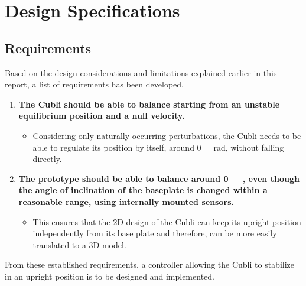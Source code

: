 \chapter{Design Specifications}\label{chap:specifications}


\section{Requirements}\label{sec:requirements}
Based on the design considerations and limitations explained earlier in this report, a list of requirements has been developed. %
%
\begin{enumerate}
\item \textbf{The Cubli should be able to balance starting from an unstable equilibrium position and a null velocity.}
  \begin{itemize}
  \item[] Considering only naturally occurring perturbations, the Cubli needs to be able to regulate its position by itself, around \si{0\ rad}, without falling directly.
  \end{itemize}

\item \textbf{The prototype should be able to balance around \si{0\ \rad}, even though the angle of inclination of the baseplate is changed within a reasonable range, using internally mounted sensors.}  
  \begin{itemize}
  \item[] This ensures that the 2D design of the Cubli can keep its upright position independently from its base plate and therefore, can be more easily translated to a 3D model.
  \end{itemize}
%  
%  	
\end{enumerate}
%
From these established requirements, a controller allowing the Cubli to stabilize in an upright position is to be designed and implemented.

